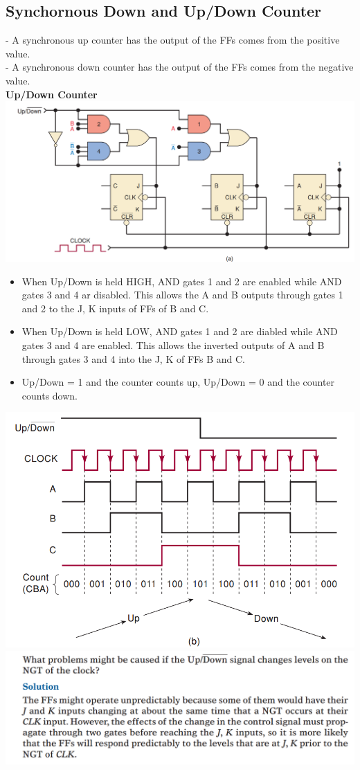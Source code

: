 \documentclass[12pt]{article}
\begin{document}
\subsection{Synchornous Down and Up/Down Counter}
- A synchronous up counter has the output of the FFs comes from the positive value. \\
- A synchronous down counter has the output of the FFs comes from the negative value. \\
\textbf{Up/Down Counter} \\
\includegraphics[scale = 0.6]{hinh47}
\begin{itemize}
	\item When Up/Down is held HIGH, AND gates 1 and 2 are enabled while AND gates 3 and 4 ar disabled. This allows the A and B outputs through gates 1 and 2 to the J, K inputs of FFs of B and C.
	\item When Up/Down is held LOW, AND gates 1 and 2 are diabled while AND gates 3 and 4 are enabled. This allows the inverted outputs of A and B through gates 3 and 4 into the J, K of FFs B and C.
	\item Up/Down = 1 and the counter counts up, Up/Down = 0 and the counter counts down.
\end{itemize}
\bigbreak
\includegraphics[scale = 0.6]{hinh48}
\bigbreak
\includegraphics[scale = 0.6]{hinh49}
\bigbreak
\end{document}
